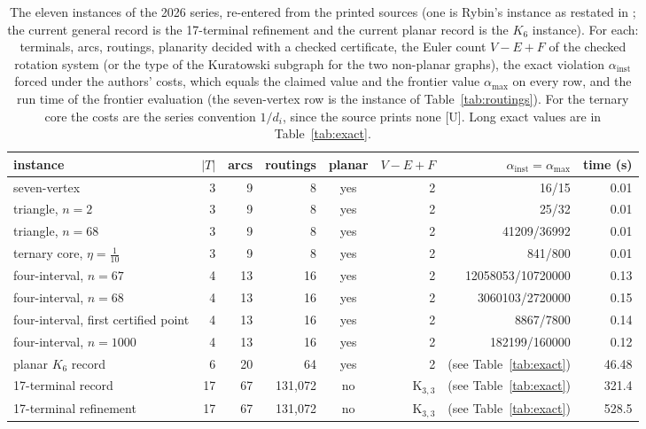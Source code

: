 \begin{table}[t]
\centering\footnotesize
\setlength{\tabcolsep}{3pt}
\begin{tabular}{@{}lrrrcrrr@{}}
\toprule
instance & $|T|$ & arcs & routings & planar & $V-E+F$ & $\alpha_{\mathrm{inst}}=\alpha_{\max}$ & time (s)\\
\midrule
seven-vertex & 3 & 9 & 8 & yes & 2 & 16/15 & 0.01\\
triangle, $n=2$ & 3 & 9 & 8 & yes & 2 & 25/32 & 0.01\\
triangle, $n=68$ & 3 & 9 & 8 & yes & 2 & 41209/36992 & 0.01\\
ternary core, $\eta=\tfrac1{10}$ & 3 & 9 & 8 & yes & 2 & 841/800 & 0.01\\
four-interval, $n=67$ & 4 & 13 & 16 & yes & 2 & 12058053/10720000 & 0.13\\
four-interval, $n=68$ & 4 & 13 & 16 & yes & 2 & 3060103/2720000 & 0.15\\
four-interval, first certified point & 4 & 13 & 16 & yes & 2 & 8867/7800 & 0.14\\
four-interval, $n=1000$ & 4 & 13 & 16 & yes & 2 & 182199/160000 & 0.12\\
planar $K_6$ record & 6 & 20 & 64 & yes & 2 & (see Table~\ref{tab:exact}) & 46.48\\
17-terminal record & 17 & 67 & 131{,}072 & no & K$_{3,3}$ & (see Table~\ref{tab:exact}) & 321.4\\
17-terminal refinement & 17 & 67 & 131{,}072 & no & K$_{3,3}$ & (see Table~\ref{tab:exact}) & 528.5\\
\bottomrule
\end{tabular}
\caption{The eleven instances of the 2026 series, re-entered from the printed sources (one is Rybin's instance as restated in \cite{Nik1}; the current general record is the 17-terminal refinement and the current planar record is the $K_6$ instance). For each: terminals, arcs, routings, planarity decided with a checked certificate, the Euler count $V-E+F$ of the checked rotation system (or the type of the Kuratowski subgraph for the two non-planar graphs), the exact violation $\alpha_{\mathrm{inst}}$ forced under the authors' costs, which equals the claimed value and the frontier value $\alpha_{\max}$ on every row, and the run time of the frontier evaluation (the seven-vertex row is the instance of Table~\ref{tab:routings}). For the ternary core the costs are the series convention $1/d_i$, since the source prints none [U]. Long exact values are in Table~\ref{tab:exact}.}
\label{tab:records}
\end{table}
